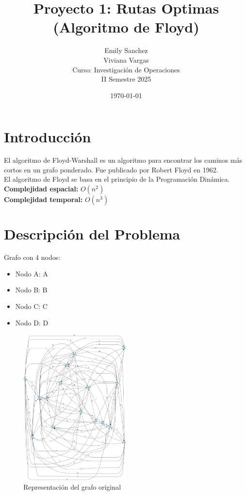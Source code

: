 \documentclass[12pt]{article}
\title{Proyecto 1: Rutas Optimas (Algoritmo de Floyd)}
\author{Emily Sanchez \\ Viviana Vargas \\[1cm] Curso: Investigación de Operaciones \\ II Semestre 2025}
\date{\today}
\begin{document}
\maketitle
\thispagestyle{empty}
\newpage
\setcounter{page}{1}

\section{Introducción}
El algoritmo de Floyd-Warshall es un algoritmo para encontrar los caminos más cortos en un grafo ponderado. Fue publicado por Robert Floyd en 1962.\\
El algoritmo de Floyd se basa en el principio de la Programación Dinámica.\\
\textbf{Complejidad espacial:} $O(n^2)$\\
\textbf{Complejidad temporal:} $O(n^3)$\\
\clearpage
\section{Descripción del Problema}
Grafo con 4 nodos:

\begin{itemize}
\item Nodo A: A
\item Nodo B: B
\item Nodo C: C
\item Nodo D: D
\end{itemize}

\begin{figure}[h!]
\centering
\includegraphics[width=0.5\textwidth,keepaspectratio]{grafo.png}
\caption{Representación del grafo original}
\end{figure}
\end{document}
